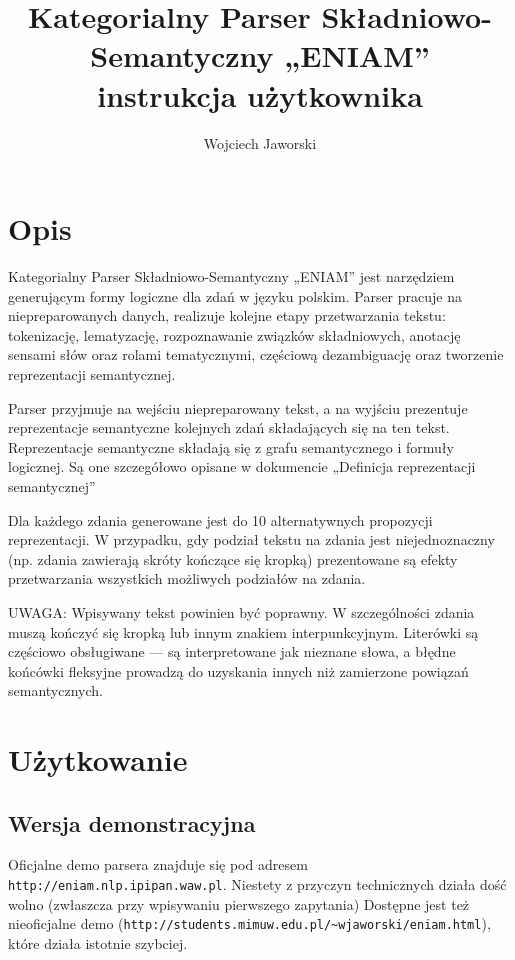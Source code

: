 \documentclass[oneside,pwrcover,withmarginpar,hidelinks,11pt]{article}
\title{Kategorialny Parser Składniowo-Semantyczny „ENIAM”\\{\Large instrukcja użytkownika}}
\author{Wojciech Jaworski}
\begin{document}
\maketitle
 
\section{Opis}
Kategorialny Parser Składniowo-Semantyczny „ENIAM” %
jest narzędziem generującym formy logiczne dla zdań w języku polskim. 
Parser pracuje na niepreparowanych danych, realizuje kolejne etapy przetwarzania tekstu: tokenizację, 
lematyzację, rozpoznawanie związków składniowych, anotację sensami słów oraz rolami tematycznymi, 
częściową dezambiguację oraz tworzenie reprezentacji semantycznej.
 
Parser przyjmuje na wejściu niepreparowany tekst, a na wyjściu prezentuje reprezentacje semantyczne
kolejnych zdań składających się na ten tekst. Reprezentacje semantyczne składają
się z grafu semantycznego i formuły logicznej. Są one szczegółowo opisane w 
dokumencie „Definicja reprezentacji semantycznej”

Dla każdego zdania generowane jest do 10 alternatywnych propozycji reprezentacji.
W przypadku, gdy podział tekstu na zdania jest niejednoznaczny (np. zdania zawierają 
skróty kończące się kropką) prezentowane są efekty przetwarzania wszystkich możliwych 
podziałów na zdania.

UWAGA: Wpisywany tekst powinien być poprawny.
W szczególności zdania muszą kończyć się kropką lub innym znakiem interpunkcyjnym. %
Literówki są częściowo obsługiwane --- są interpretowane jak nieznane słowa,
a błędne końcówki fleksyjne prowadzą do uzyskania innych niż zamierzone powiązań semantycznych.
 
\section{Użytkowanie}

\subsection{Wersja demonstracyjna}
Oficjalne demo parsera znajduje się pod adresem {\tt http://eniam.nlp.ipipan.waw.pl}. 
Niestety z przyczyn technicznych działa dość wolno (zwłaszcza przy wpisywaniu 
pierwszego zapytania) Dostępne jest też nieoficjalne demo
({\tt http://students.mimuw.edu.pl/\textasciitilde{}wjaworski/eniam.html}),
które działa istotnie szybciej.
\end{document}
